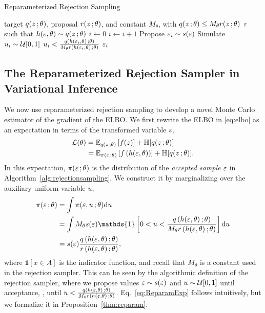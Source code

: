 \begin{algorithm}[t]
\caption{Reparameterized Rejection Sampling}\label{alg:rejectionsampling}
\begin{algorithmic}[1]
\REQUIRE target $q(z\, ; \theta)$, proposal $r(z\, ; \theta)$, and constant $M_\theta$, with $q(z\, ; \theta) \leq M_\theta r(z\, ; \theta)$ 
\ENSURE $\varepsilon$ such that $h(\varepsilon,\theta) \sim q(z\, ; \theta)$
\STATE $i \gets 0$
\REPEAT 
\STATE $i \gets i +1 $
\STATE Propose $\varepsilon_i \sim s(\varepsilon)$
\STATE Simulate $u_i \sim \mathcal{U}[0,1]$
\UNTIL $u_i < \frac{q\left(h(\varepsilon_i,\theta)\, ; \theta\right)}{M_\theta r\left(h(\varepsilon_i,\theta) \, ; \theta\right)}$
\RETURN $\varepsilon_i$
\end{algorithmic}
\end{algorithm}



%
\subsection{The Reparameterized Rejection Sampler in Variational Inference}
\label{subsec:method}

We now use reparameterized rejection sampling to develop a novel Monte Carlo estimator of the gradient of the \gls{ELBO}. We first rewrite the \gls{ELBO} in \eqref{eq:elbo} as an expectation in terms of the transformed variable $\varepsilon$,
\begin{align}
\begin{split}
&\mathcal{L}(\theta) = \mathbb{E}_{q(z\, ; \theta)}\left[f(z)\right] + \mathbb{H}[q(z\, ; \theta)] \\
&\quad\quad=\mathbb{E}_{\pi(\varepsilon\, ;\theta)}\left[f\left(h(\varepsilon,\theta)\right)\right] + \mathbb{H}[q(z\, ; \theta)].
\end{split}
\label{eq:ReparamExp}
\end{align}
In this expectation, $\pi(\varepsilon\, ;\theta)$ is the distribution of the \emph{accepted sample} $\varepsilon$ in Algorithm~\ref{alg:rejectionsampling}. We construct it by marginalizing over the auxiliary uniform variable $u$,
\begin{align}
\pi(\eps\g\theta) &= \int \pi(\eps,u\g\theta) \myd u \nonumber\\
&= \int M_\theta s(\eps) 
\mathds{1}
\left[0 < u < \frac{q\left(h(\eps,\theta)\g \theta\right)}{M_\theta r\left(h(\eps,\theta)\g \theta\right)}\right] \myd u \nonumber\\
&= s(\eps) \frac{q\left(h(\eps,\theta)\g \theta\right)}{r\left(h(\eps,\theta)\g \theta\right)},
\label{eq:distrejection}
\end{align}
where $\mathds{1}[x \in A]$ is the indicator function, and recall that $M_\theta$ is a constant used in the rejection sampler. %
This can be seen by the algorithmic definition of the rejection sampler, where we propose values $\varepsilon \sim s(\varepsilon)$ and $u \sim \mathcal{U}[0,1]$ until acceptance, \ie, until $u < \frac{q\left(h(\varepsilon,\theta)\, ; \theta\right)}{M_\theta r\left(h(\varepsilon,\theta) \, ; \theta\right)}$. Eq.~\ref{eq:ReparamExp} follows intuitively, but we formalize it in Proposition~\ref{thm:reparam}.



